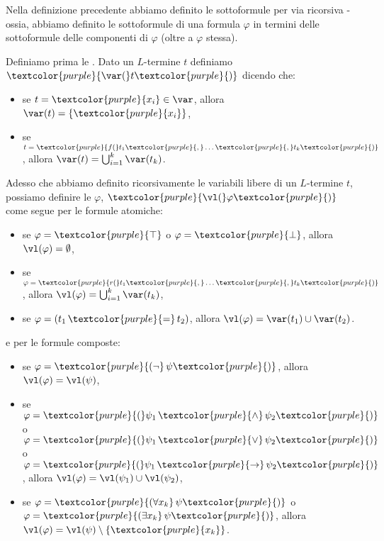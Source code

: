 Nella definizione precedente abbiamo definito le sottoformule per via ricorsiva - ossia, abbiamo definito le sottoformule di una formula $\varphi$ in termini delle sottoformule delle componenti di $\varphi$ (oltre a $\varphi$ stessa).

\begin{definition}
    Definiamo prima le . Dato un $L$-termine $t$ definiamo $\textcolor{purple}{\var(} t \textcolor{purple}{)}$ dicendo che:
    \begin{itemize}
        \item se $t = \textcolor{purple}{x_i} \in \var$, allora $\var(t) = \{\textcolor{purple}{x_i}\}$,
        \item se $t = \textcolor{purple}{f(}t_1\textcolor{purple}{,} \ldots\textcolor{purple}{,} t_k\textcolor{purple}{)}$, allora $\var(t) = \bigcup_{i = 1}^k \var(t_k)$.
    \end{itemize}
    Adesso che abbiamo definito ricorsivamente le variabili libere di un $L$-termine $t$, possiamo definire le  $\varphi$, $\textcolor{purple}{\vl(} \varphi \textcolor{purple}{)}$ come segue per le formule atomiche:
    \begin{itemize}
        \item se $\varphi = \textcolor{purple}{\top}$ o $\varphi = \textcolor{purple}{\bot}$, allora $\vl(\varphi) = \emptyset$,
        \item se $\varphi = \textcolor{purple}{r(} t_1\textcolor{purple}{,} \ldots\textcolor{purple}{,} t_k\textcolor{purple}{)}$, allora $\vl(\varphi) = \bigcup_{i = 1}^k \var(t_k)$,
        \item se $\varphi = (t_1\, \textcolor{purple}{=}\, t_2)$, allora $\vl(\varphi) = \var(t_1) \cup \var(t_2)$.
    \end{itemize}
    e per le formule composte:
    \begin{itemize}
        \item se $\varphi = \textcolor{purple}{(\neg}\, \psi \textcolor{purple}{)}$, allora $\vl(\varphi) = \vl(\psi)$,
        \item se $\varphi = \textcolor{purple}{(} \psi_1 \,\textcolor{purple}{\land} \,\psi_2 \textcolor{purple}{)}$ o $\varphi = \textcolor{purple}{(} \psi_1\, \textcolor{purple}{\lor}\, \psi_2 \textcolor{purple}{)}$ o $\varphi = \textcolor{purple}{(} \psi_1\, \textcolor{purple}{\to} \,\psi_2 \textcolor{purple}{)}$, allora $\vl(\varphi) = \vl(\psi_1) \cup \vl(\psi_2)$,
        \item se $\varphi = \textcolor{purple}{(\forall x_k} \,\psi \textcolor{purple}{)}$ o $\varphi = \textcolor{purple}{(\exists x_k}\, \psi \textcolor{purple}{)}$, allora $\vl(\varphi) = \vl(\psi) \setminus \{\textcolor{purple}{x_k}\}$.
    \end{itemize}
\end{definition}

